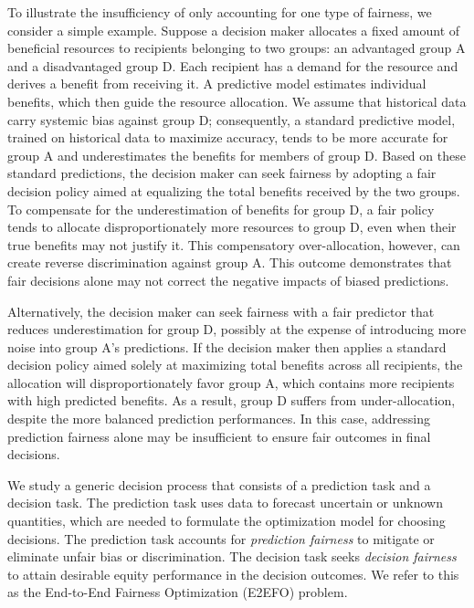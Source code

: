 \documentclass[ijoc,sglanonrev]{informs4}
\begin{document}
To illustrate the insufficiency of only accounting for one type of fairness, we consider a simple example. Suppose a decision maker allocates a fixed amount of beneficial resources to recipients belonging to two groups: an advantaged group A and a disadvantaged group D. Each recipient has a demand for the resource and derives a benefit from receiving it. 
A predictive model estimates individual benefits, which then guide the resource allocation. We assume that historical data carry systemic bias against group D; consequently, a standard predictive model, trained on historical data to maximize accuracy, tends to be more accurate for group A and underestimates the benefits for members of group D. Based on these standard predictions, the decision maker can seek fairness by adopting a fair decision policy aimed at equalizing the total benefits received by the two groups. To compensate for the underestimation of benefits for group D, a fair policy tends to allocate disproportionately more resources to group D, even when their true benefits may not justify it. This compensatory over-allocation, however, can create reverse discrimination against group A. This outcome demonstrates that fair decisions alone may not correct the negative impacts of biased predictions. 

Alternatively, the decision maker can seek fairness with a fair predictor that reduces underestimation for group D, possibly at the expense of introducing more noise into group A's predictions. If the decision maker then applies a standard decision policy aimed solely at maximizing total benefits across all recipients, the allocation will disproportionately favor group A, which contains more recipients with high predicted benefits. As a result, group D suffers from under-allocation, despite the more balanced prediction performances. In this case, addressing prediction fairness alone may be insufficient to ensure fair outcomes in final decisions. 

We study a generic decision process that consists of a prediction task and a decision task. The prediction task uses data to forecast uncertain or unknown quantities, which are needed to formulate the optimization model for choosing decisions. The prediction task accounts for \emph{prediction fairness} to mitigate or eliminate unfair bias or discrimination. The decision task seeks \emph{decision fairness} to attain desirable equity performance in the decision outcomes. We refer to this as the End-to-End Fairness Optimization (E2EFO) problem. 
\end{document}
